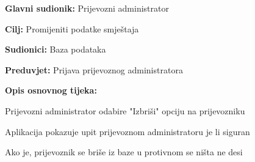 			\noindent {}
			\begin{packed_item}
				
				\item \textbf{Glavni sudionik: }Prijevozni administrator
				\item  \textbf{Cilj:} Promijeniti podatke smještaja
				\item  \textbf{Sudionici:} Baza podataka
				\item  \textbf{Preduvjet:} Prijava prijevoznog administratora
				\item  \textbf{Opis osnovnog tijeka:}
				
				\item[] \begin{packed_enum}
					
					\item Prijevozni administrator odabire "Izbriši" opciju na prijevozniku
					\item Aplikacija pokazuje upit prijevoznom administratoru je li siguran
					\item Ako je, prijevoznik se briše iz baze u protivnom se ništa ne desi
				\end{packed_enum}
				
			\end{packed_item}
			
